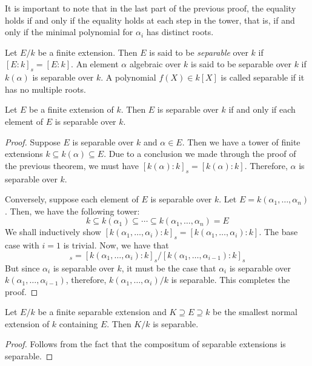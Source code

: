 \begin{mdframed}[]
    It is important to note that in the last part of the previous proof, the equality holds if and only if the equality holds at each step in the tower, that is, if and only if the minimal polynomial for $\alpha_i$ has distinct roots.
\end{mdframed}

\begin{definition}[Separable]
    Let $E/k$ be a finite extension. Then $E$ is said to be \textit{separable} over $k$ if $[E:k]_s = [E:k]$. An element $\alpha$ algebraic over $k$ is said to be separable over $k$ if $k(\alpha)$ is separable over $k$. A polynomial $f(X)\in k[X]$ is called separable if it has no multiple roots.
\end{definition}

\begin{theorem}
    Let $E$ be a finite extension of $k$. Then $E$ is separable over $k$ if and only if each element of $E$ is separable over $k$.
\end{theorem}
\begin{proof}
    Suppose $E$ is separable over $k$ and $\alpha\in E$. Then we have a tower of finite extensions $k\subseteq k(\alpha)\subseteq E$. Due to a conclusion we made through the proof of the previous theorem, we must have $[k(\alpha):k]_s = [k(\alpha):k]$. Therefore, $\alpha$ is separable over $k$.

    Conversely, suppose each element of $E$ is separable over $k$. Let $E = k(\alpha_1,\ldots,\alpha_n)$. Then, we have the following tower: 
    \begin{equation*}
        k\subseteq k(\alpha_1)\subseteq\cdots\subseteq k(\alpha_1,\ldots,\alpha_n) = E
    \end{equation*}
    We shall inductively show $[k(\alpha_1,\ldots,\alpha_i):k]_s = [k(\alpha_1,\ldots,\alpha_i):k]$. The base case with $i = 1$ is trivial. Now, we have that 
    \begin{equation*}
        [k(\alpha_1,\ldots,\alpha_i):k(\alpha_1,\ldots,\alpha_{i - 1})]_s = [k(\alpha_1,\ldots,\alpha_i):k]_s/[k(\alpha_1,\ldots,\alpha_{i - 1}):k]_s
    \end{equation*}
    But since $\alpha_i$ is separable over $k$, it must be the case that $\alpha_i$ is separable over $k(\alpha_1,\ldots,\alpha_{i - 1})$, therefore, $k(\alpha_1,\ldots,\alpha_i)/k$ is separable. This completes the proof.
\end{proof}

\begin{theorem}
    Let $E/k$ be a finite separable extension and $K\supseteq E\supseteq k$ be the smallest normal extension of $k$ containing $E$. Then $K/k$ is separable.
\end{theorem}
\begin{proof}
    Follows from the fact that the compositum of separable extensions is separable.
\end{proof}


